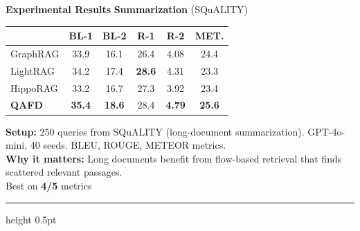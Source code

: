 \documentclass[final]{beamer}
\newlength{\colC}\setlength{\colC}{0.26\paperwidth}   %
\begin{document}
\begin{frame}[t]
\begin{columns}[t]
\begin{column}{\colC}
\begin{block}{\Large\textbf{\color{samsungblue} Experimental Results}}
\textbf{\large\color{samsungblue} Summarization} {\small(SQuALITY)}\par\vspace{0.3em}
\begin{table}
\vspace{-0.8em}
\scriptsize
\begin{tabular}{l ccccc}
  \toprule
  & \textbf{BL-1} & \textbf{BL-2} & \textbf{R-1} & \textbf{R-2} & \textbf{MET.} \\
  \midrule
  GraphRAG  & 33.9 & 16.1 & 26.4 & 4.08 & 24.4 \\
  LightRAG  & 34.2 & 17.4 & \textbf{28.6} & 4.31 & 23.3 \\
  HippoRAG & 33.2 & 16.7 & 27.3 & 3.92 & 23.4 \\
  \midrule
  \textbf{QAFD} & \textbf{35.4} & \textbf{18.6} & 28.4 & \textbf{4.79} & \textbf{25.6} \\
  \bottomrule
\end{tabular}
\vspace{-0.8em}
\end{table}
\noindent\scriptsize
\textbf{Setup:} 250 queries from SQuALITY (long-document summarization). GPT-4o-mini, 40 seeds. BLEU, ROUGE, METEOR metrics.\\[3pt]
\textbf{Why it matters:} Long documents benefit from flow-based retrieval that finds scattered relevant passages.\\[3pt]
\colorbox{accentgreen!15}{Best on \textbf{4/5} metrics}\par
\vspace{0.5em}
{\color{samsungblue!30}\hrule height 0.5pt}
\vspace{0.5em}


\end{block}
\end{column}
\end{columns}
\end{frame}
\end{document}
